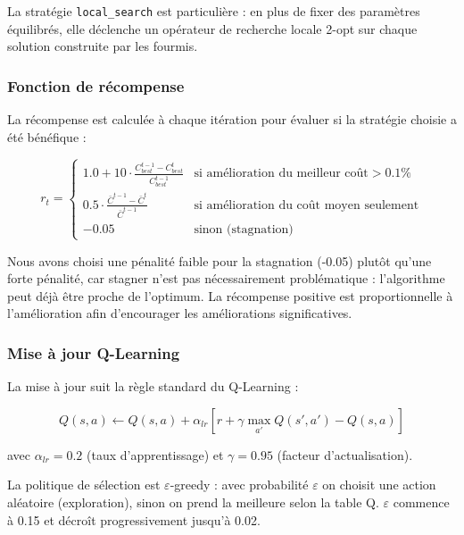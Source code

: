 \documentclass[12pt, a4paper]{article}
\begin{document}
La stratégie \texttt{local\_search} est particulière : en plus de fixer des paramètres équilibrés, elle déclenche un opérateur de recherche locale 2-opt sur chaque solution construite par les fourmis.

\subsubsection{Fonction de récompense}

La récompense est calculée à chaque itération pour évaluer si la stratégie choisie a été bénéfique :

\begin{equation}
    r_t = \begin{cases}
        1.0 + 10 \cdot \frac{C_{best}^{t-1} - C_{best}^{t}}{C_{best}^{t-1}} & \text{si amélioration du meilleur coût} > 0.1\% \\
        0.5 \cdot \frac{\bar{C}^{t-1} - \bar{C}^{t}}{\bar{C}^{t-1}} & \text{si amélioration du coût moyen seulement} \\
        -0.05 & \text{sinon (stagnation)}
    \end{cases}
\end{equation}

Nous avons choisi une pénalité faible pour la stagnation (-0.05) plutôt qu'une forte pénalité, car stagner n'est pas nécessairement problématique : l'algorithme peut déjà être proche de l'optimum. La récompense positive est proportionnelle à l'amélioration afin d'encourager les améliorations significatives.

\subsubsection{Mise à jour Q-Learning}

La mise à jour suit la règle standard du Q-Learning \cite{watkins1992qlearning} :

\begin{equation}
    Q(s, a) \leftarrow Q(s, a) + \alpha_{lr} \left[ r + \gamma \max_{a'} Q(s', a') - Q(s, a) \right]
\end{equation}

avec $\alpha_{lr} = 0.2$ (taux d'apprentissage) et $\gamma = 0.95$ (facteur d'actualisation).

La politique de sélection est $\varepsilon$-greedy : avec probabilité $\varepsilon$ on choisit une action aléatoire (exploration), sinon on prend la meilleure selon la table Q. $\varepsilon$ commence à 0.15 et décroît progressivement jusqu'à 0.02.
\end{document}
